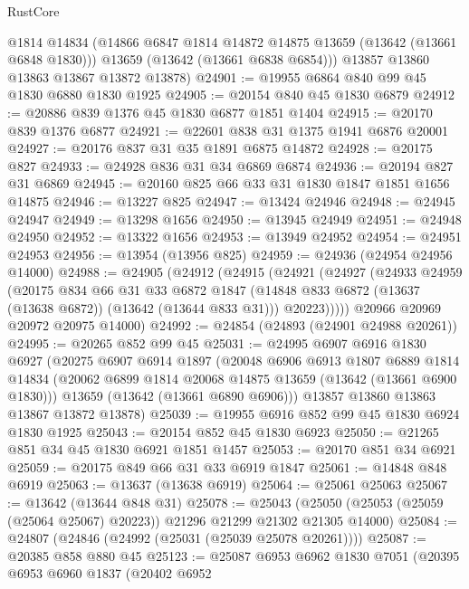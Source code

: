 \begin{lexlean}{RustCore}
\begin{coremodule}
        @1814
        @14834
        (@14866 @6847 @1814 @14872 @14875 @13659 (@13642 (@13661 @6848 @1830)))
        @13659
        (@13642 (@13661 @6838 @6854)))
      @13857
      @13860
      @13863
      @13867
      @13872
      @13878)
@24901 := @19955 @6864 @840 @99 @45 @1830 @6880 @1830 @1925
@24905 := @20154 @840 @45 @1830 @6879
@24912 := @20886 @839 @1376 @45 @1830 @6877 @1851 @1404
@24915 := @20170 @839 @1376 @6877
@24921 := @22601 @838 @31 @1375 @1941 @6876 @20001
@24927 := @20176 @837 @31 @35 @1891 @6875 @14872
@24928 := @20175 @827
@24933 := @24928 @836 @31 @34 @6869 @6874
@24936 := @20194 @827 @31 @6869
@24945 := @20160 @825 @66 @33 @31 @1830 @1847 @1851 @1656 @14875
@24946 := @13227 @825
@24947 := @13424 @24946
@24948 := @24945 @24947
@24949 := @13298 @1656
@24950 := @13945 @24949
@24951 := @24948 @24950
@24952 := @13322 @1656
@24953 := @13949 @24952
@24954 := @24951 @24953
@24956 := @13954 (@13956 @825)
@24959 := @24936 (@24954 @24956 @14000)
@24988 := @24905
    (@24912
      (@24915
        (@24921
          (@24927
            (@24933
              @24959
              (@20175
                @834
                @66
                @31
                @33
                @6872
                @1847
                (@14848 @833 @6872 (@13637 (@13638 @6872)) (@13642 (@13644 @833 @31)))
                @20223)))))
      @20966
      @20969
      @20972
      @20975
      @14000)
@24992 := @24854 (@24893 (@24901 @24988 @20261))
@24995 := @20265 @852 @99 @45
@25031 := @24995
    @6907
    @6916
    @1830
    @6927
    (@20275
      @6907
      @6914
      @1897
      (@20048
        @6906
        @6913
        @1807
        @6889
        @1814
        @14834
        (@20062 @6899 @1814 @20068 @14875 @13659 (@13642 (@13661 @6900 @1830)))
        @13659
        (@13642 (@13661 @6890 @6906)))
      @13857
      @13860
      @13863
      @13867
      @13872
      @13878)
@25039 := @19955 @6916 @852 @99 @45 @1830 @6924 @1830 @1925
@25043 := @20154 @852 @45 @1830 @6923
@25050 := @21265 @851 @34 @45 @1830 @6921 @1851 @1457
@25053 := @20170 @851 @34 @6921
@25059 := @20175 @849 @66 @31 @33 @6919 @1847
@25061 := @14848 @848 @6919
@25063 := @13637 (@13638 @6919)
@25064 := @25061 @25063
@25067 := @13642 (@13644 @848 @31)
@25078 := @25043
    (@25050 (@25053 (@25059 (@25064 @25067) @20223)) @21296 @21299 @21302 @21305 @14000)
@25084 := @24807 (@24846 (@24992 (@25031 (@25039 @25078 @20261))))
@25087 := @20385 @858 @880 @45
@25123 := @25087
    @6953
    @6962
    @1830
    @7051
    (@20395
      @6953
      @6960
      @1837
      (@20402
        @6952

\end{coremodule}
\end{lexlean}
